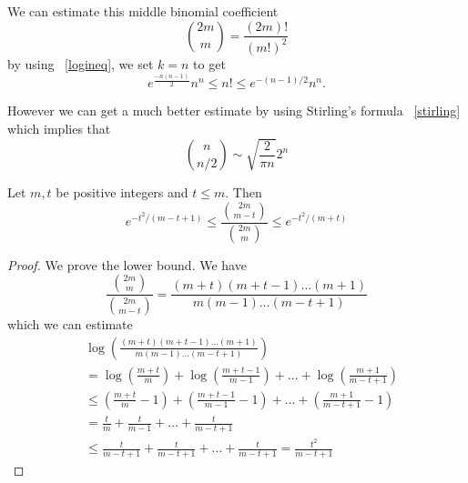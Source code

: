We can estimate this middle binomial coefficient
$$
\binom{2m}{m}=\frac{(2m)!}{(m!)^{2}}
$$
by using ~\ref{logineq}, we set $k=n$ to get 
$$
e^{\frac{-n(n-1)}{2}}n^n\le n! \le e^{-(n-1)/2}n^{n}.
$$

However we can get a much better estimate by using Stirling's formula ~\ref{stirling} which implies that
$$
\binom{n}{n/2}\sim \sqrt{ \frac{2}{\pi n}}2^{n}
$$

\begin{proposition}
Let $m,t$ be positive integers and $t\leq m$. Then
$$
e^{-t^{2}/(m-t+1)}\leq \frac{{2m\choose m-t}}{{2m\choose m}} \leq  e^{-t^{2}/(m+t)}
$$
\end{proposition}
\begin{proof}
We prove the lower bound. We have
$$
\frac{\binom{2m}{m}}{\binom{2m}{m-t}}=\frac{(m+t)(m+t-1)\dots(m+1)}{m(m-1)\dots (m-t+1)}
$$
which we can estimate
\begin{align*}
 & \log\left( \frac{(m+t)(m+t-1)\dots(m+1)}{m(m-1)\dots (m-t+1)} \right) \\
 & =\log\left( \frac{m+t}{m} \right)+\log\left( \frac{m+t-1}{m-1} \right)+\dots+\log\left( \frac{m+1}{m-t+1} \right) \\
 & \le \left( \frac{m+t}{m}-1 \right)+\left( \frac{m+t-1}{m-1}-1 \right)+\dots+\left( \frac{m+1}{m-t+1}-1 \right) \\
 & =\frac{t}{m}+\frac{t}{m-1}+\dots+\frac{t}{m-t+1} \\
 & \le \frac{t}{m-t+1}+\frac{t}{m-t+1}+\dots+\frac{t}{m-t+1}=\frac{t^{2}}{m-t+1}
\end{align*}
\end{proof}
